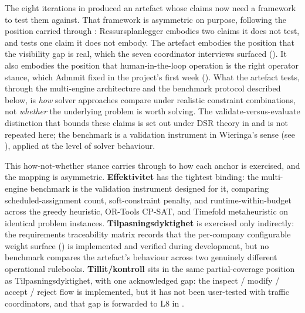 The eight iterations in  produced an artefact whose claims now need a framework to test them against. That framework is asymmetric on purpose, following the position carried through : Ressursplanlegger embodies two claims it does not test, and tests one claim it does not embody. The artefact embodies the position that the visibility gap is real, which the seven coordinator interviews surfaced (). It also embodies the position that human-in-the-loop operation is the right operator stance, which Admmit fixed in the project's first week (). What the artefact tests, through the multi-engine architecture and the benchmark protocol described below, is \emph{how} solver approaches compare under realistic constraint combinations, not \emph{whether} the underlying problem is worth solving. The validate-versus-evaluate distinction that bounds these claims is set out under DSR theory in  and is not repeated here; the benchmark is a validation instrument in Wieringa's sense (see ), applied at the level of solver behaviour.

This how-not-whether stance carries through to how each anchor is exercised, and the mapping is asymmetric. \textbf{Effektivitet} has the tightest binding: the multi-engine benchmark is the validation instrument designed for it, comparing scheduled-assignment count, soft-constraint penalty, and runtime-within-budget across the greedy heuristic, OR-Tools CP-SAT, and Timefold metaheuristic on identical problem instances. \textbf{Tilpasningsdyktighet} is exercised only indirectly: the requirements traceability matrix records that the per-company configurable weight surface () is implemented and verified during development, but no benchmark compares the artefact's behaviour across two genuinely different operational rulebooks. \textbf{Tillit/kontroll} sits in the same partial-coverage position as Tilpasningsdyktighet, with one acknowledged gap: the inspect / modify / accept / reject flow is implemented, but it has not been user-tested with traffic coordinators, and that gap is forwarded to L8 in .

